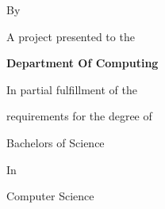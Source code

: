 \begin{titlepage}
    \begin{titlepagetext}
    \centering
    \vspace*{2.5cm}

    \titlepagetitle
    \vspace{1.5cm}

    {\large By\par}
    \vspace{0.5cm}

    \titlepagestudents

    \vspace{1.2cm}
    {\large A project presented to the\par}
    {\large\bfseries Department Of Computing\par}
    {\large In partial fulfillment of the\par}
    {\large requirements for the degree of\par}
    {\large Bachelors of Science\par}
    {\large In\par}
    {\large Computer Science\par}

    \vfill
    \titlepagefooterbottom
    \end{titlepagetext}
\end{titlepage}

